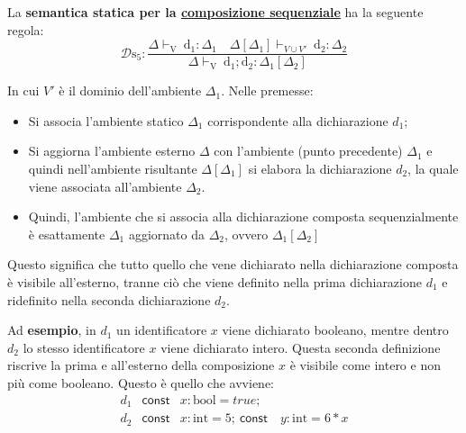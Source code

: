\documentclass[a4paper]{article}
\begin{document}
	\noindent
	La \textbf{semantica statica per la \underline{composizione sequenziale}} ha la seguente regola:
	\begin{equation*}
		\mathcal{D}\mathrm{s}_{5} : \dfrac{
			\Delta\vdash_{\mathrm{V}} \: \mathrm{d}_{1}:\Delta_{1} \hspace{1em} \Delta\left[\Delta_{1}\right] \vdash_{V \cup V'} \: \mathrm{d}_{2} : \Delta_{2}
		}{
			\Delta\vdash_{\mathrm{V}} \: \mathrm{d}_{1} \mathbf{;} \mathrm{d}_{2}:\Delta_{1}\left[\Delta_{2}\right]
		}
	\end{equation*}
	
	\noindent
	In cui $V'$ è il dominio dell'ambiente $\Delta_{1}$. Nelle premesse:
	\begin{itemize}
		\item Si associa l'ambiente statico $\Delta_{1}$ corrispondente alla dichiarazione $d_{1}$;
		
		\item Si aggiorna l'ambiente esterno $\Delta$ con l'ambiente (punto precedente) $\Delta_{1}$ e quindi nell'ambiente risultante $\Delta\left[\Delta_{1}\right]$ si elabora la dichiarazione $d_{2}$, la quale viene associata all'ambiente $\Delta_{2}$.
		
		\item Quindi, l'ambiente che si associa alla dichiarazione composta sequenzialmente è esattamente $\Delta_{1}$ aggiornato da $\Delta_{2}$, ovvero $\Delta_{1}\left[\Delta_{2}\right]$
	\end{itemize}
	Questo significa che tutto quello che vene dichiarato nella dichiarazione composta è visibile all'esterno, tranne ciò che viene definito nella prima dichiarazione $d_{1}$ e ridefinito nella seconda dichiarazione $d_{2}$.\newpage
	
	\noindent
	Ad \textcolor{Green4}{\textbf{esempio}}, in $d_{1}$ un identificatore $x$ viene dichiarato booleano, mentre dentro $d_{2}$ lo stesso identificatore $x$ viene dichiarato intero. Questa seconda definizione riscrive la prima e all'esterno della composizione $x$ è visibile come intero e non più come booleano. Questo è quello che avviene:
	\begin{equation*}
		\begin{array}{lll}
			d_{1} & \mathsf{const} & x:\mathrm{bool} = true; \\
			d_{2} & \mathsf{const} & x:\mathrm{int} = 5; \: \mathsf{const} \hspace{1em} y: \mathrm{int} = 6*x
		\end{array}
	\end{equation*}
	
\end{document}
